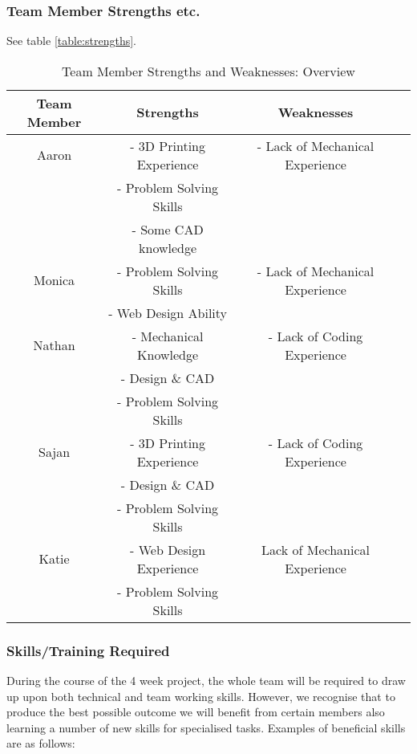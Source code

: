 \documentclass[12pt]{article}
\begin{document}
\subsubsection{Team Member Strengths etc.}
See table \ref{table:strengths}.
\begin{table}[!h]
\begin{center}
\begin{tabular}{|c|c|c|c|}
\hline
Team Member & Strengths & Weaknesses\\
 \hline
Aaron & - 3D Printing Experience & - Lack of Mechanical Experience\\
& - Problem Solving Skills & \\
& - Some CAD knowledge & \\
\hline
Monica & - Problem Solving Skills & - Lack of Mechanical Experience \\
& - Web Design Ability & \\
\hline
Nathan & - Mechanical Knowledge & - Lack of Coding Experience \\
& - Design \& CAD & \\
& - Problem Solving Skills &\\
\hline
Sajan & - 3D Printing Experience & - Lack of Coding Experience\\
& - Design \& CAD & \\
& - Problem Solving Skills &\\
\hline
Katie & - Web Design Experience & Lack of Mechanical Experience\\
& - Problem Solving Skills &\\
\hline
\end{tabular}
\caption{Team Member Strengths and Weaknesses: Overview \label{table:strengths}}
\end{center}
\label{default}
\end{table}

\subsubsection{Skills/Training Required}

During the course of the 4 week project, the whole team will be required to draw up upon both technical and team working skills. However, we recognise that to produce the best possible outcome we will benefit from certain members also learning a number of new skills for specialised tasks. Examples of beneficial skills are as follows:  
\end{document}
